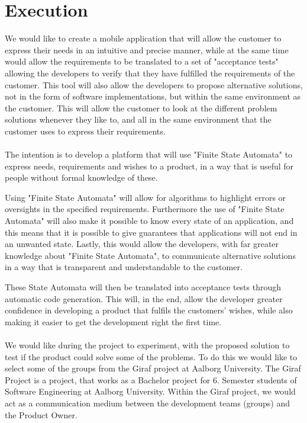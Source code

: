 \section{Execution}
We would like to create a mobile application that will allow the customer to express their needs in an intuitive and precise manner, while at the same time would allow the requirements to be translated to a set of "acceptance tests" allowing the developers to verify that they have fulfilled the requirements of the customer.
This tool will also allow the developers to propose alternative solutions, not in the form of software implementations, but within the same environment as the customer. 
This will allow the customer to look at the different problem solutions whenever they like to, and all in the same environment that the customer uses to express their requirements. 
\\\\
The intention is to develop a platform that will use "Finite State Automata" to express needs, requirements and wishes to a product, in a way that is useful for people without formal knowledge of these. 

Using "Finite State Automata" will allow for algorithms to highlight errors or oversights in the specified requirements.
Furthermore the use of "Finite State Automata" will also make it possible to know every state of an application, and this means that it is possible to give guarantees that applications will not end in an unwanted state. 
Lastly, this would allow the developers, with far greater knowledge about "Finite State Automata", to communicate alternative solutions in a way that is transparent and understandable to the customer. 

These State Automata will then be translated into acceptance tests through automatic code generation.
This will, in the end, allow the developer greater confidence in developing a product that fulfils the customers' wishes, while also making it easier to get the development right the first time.
\\\\
We would like during the project to experiment, with the proposed solution to test if the product could solve some of the problems.
To do this we would like to select some of the groups from the Giraf project at Aalborg University.
The Giraf Project is a project, that works as a Bachelor project for 6. Semester students of Software Engineering at Aalborg University. 
Within the Giraf project, we would act as a communication medium between the development teams (groups) and the Product Owner.

